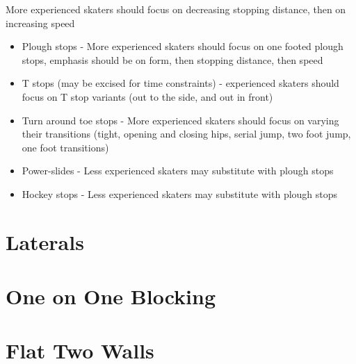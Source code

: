 \documentclass{journal}
\begin{document}
More experienced skaters should focus on decreasing stopping distance, then on increasing speed

\begin{itemize}
    \item Plough stops - More experienced skaters should focus on one footed plough stops, emphasis should be on form, then stopping distance, then speed 
    \item T stops (may be excised for time constraints) - experienced skaters should focus on T stop variants (out to the side, and out in front)  
    \item Turn around toe stops - More experienced skaters should focus on varying their transitions (tight, opening and closing hips, serial jump, two foot jump, one foot transitions)    
    \item Power-slides - Less experienced skaters may substitute with plough stops
    \item Hockey stops - Less experienced skaters may substitute with plough stops
\end{itemize}


\section*{Laterals}







\section*{One on One Blocking}









\section*{Flat Two Walls}
\end{document}
